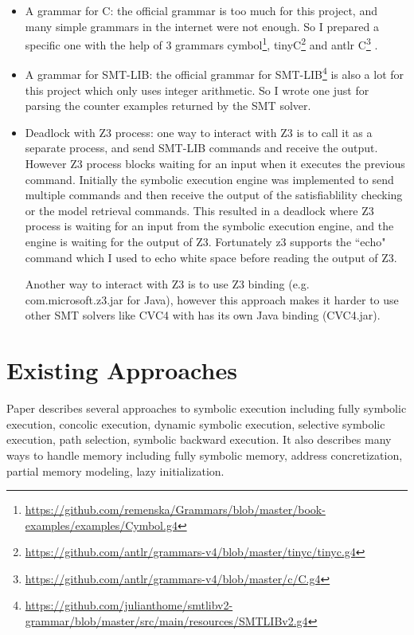 \documentclass[12pt,a4paper]{article}
\begin{document}
\begin{itemize}
\item A grammar for C: the official grammar is too much for this project, and many simple grammars in the internet were not enough. So I prepared a specific one with the help of 3 grammars 
cymbol\footnote{\url{https://github.com/remenska/Grammars/blob/master/book-examples/examples/Cymbol.g4}}, tinyC\footnote{\url{https://github.com/antlr/grammars-v4/blob/master/tinyc/tinyc.g4}}
and antlr C\footnote{\url{https://github.com/antlr/grammars-v4/blob/master/c/C.g4}} .  

\item  A grammar for SMT-LIB: the official grammar for SMT-LIB\footnote{\url{https://github.com/julianthome/smtlibv2-grammar/blob/master/src/main/resources/SMTLIBv2.g4}} is also a lot for this project which only uses integer arithmetic. So I wrote one just for parsing the counter examples returned by the SMT solver. 


\item Deadlock with Z3 process: one way to interact with Z3 is to call it as a separate process, and send SMT-LIB commands and receive the output. However Z3 process blocks waiting for an input when it executes the previous command. Initially the symbolic execution engine was implemented to send multiple commands and then receive the output of the satisfiablility checking or the model retrieval commands. This resulted in a deadlock where Z3 process is waiting for an input from the symbolic execution engine, and the engine is waiting for the output of Z3. Fortunately z3 supports the ``echo" command which I used to echo white space before reading the output of Z3. 

Another way to interact with Z3 is to use Z3 binding (e.g. com.microsoft.z3.jar for Java), however this approach makes it harder to use other SMT solvers like CVC4 with has its own Java binding (CVC4.jar). 
\end{itemize}

\section{Existing Approaches}

Paper \cite{paper} describes several approaches to symbolic execution including fully symbolic execution,  concolic execution, dynamic symbolic execution, selective symbolic execution, path selection, symbolic backward execution. It also describes many ways to handle memory including  fully symbolic memory, address concretization, partial memory modeling, lazy initialization. 
\end{document}
